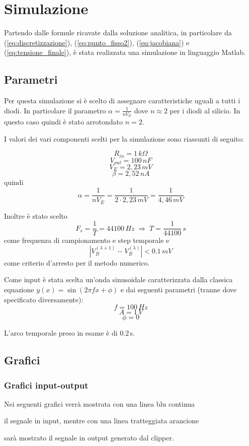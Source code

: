 \chapter{Simulazione}
	Partendo dalle formule ricavate dalla soluzione analitica, in particolare da (\ref{eq:discretizzazione}), (\ref{eq:punto_fisso2}), (\ref{eq:jacobiana}) e (\ref{eq:tensione_finale}), è stata realizzata una simulazione in linguaggio Matlab.
	
	\section{Parametri}
		Per questa simulazione si è scelto di assegnare caratteristiche uguali a tutti i diodi. In particolare il parametro $\alpha = \frac{1}{nV_{E}}$ dove $n \approx 2$ per i diodi al silicio. In questo caso quindi è stato arrotondato $n = 2$.
	
		I valori dei vari componenti scelti per la simulazione sono riassunti di seguito:
	
		\[
			R_{in} = 1\,k\Omega
		\]
		\[
			V_{out} = 100\,nF
		\]
		\[
			V_{E} = 2,23\,mV
		\]
		\[
			\beta = 2,52\,nA
		\]
		quindi
		\[
			\alpha = \frac{1}{nV_{E}} = \frac{1}{2 \cdot 2,23\,mV} = \frac{1}{4,46\,mV}
		\]
	
		Inoltre è stato scelto
		\[
			F_{s} = \frac{1}{T} = 44100\,Hz \; \Rightarrow \; T = \frac{1}{44100}\,s
		\]
		come frequenza di campionamento e step temporale e
		\[
			|V_{B}^{(\lambda+1)} - V_{B}^{(\lambda)}| < 0.1\,mV
		\]
		come criterio d'arresto per il metodo numerico.
	
		Come input è stata scelta un'onda sinusoidale caratterizzata dalla classica equazione $y(x) = \sin (2 \pi f x + \phi)$ e dai seguenti parametri (tranne dove specificato diversamente):
		\[
			f = 100\,Hz
		\]
		\[
			A = 1\,V
		\]
		\[
			\phi = 0
		\]
		
		\vspace{10px}
		L'arco temporale preso in esame è di 0.2\,s.
	\pagebreak
	
	\section{Grafici}
		\subsection{Grafici input-output}
			Nei seguenti grafici verrà mostrata con una linea blu continua
			il segnale in \textcolor{matlab_blue}{input}, mentre con una linea tratteggiata arancione
			sarà mostrato il segnale in \textcolor{matlab_orange}{output} generato dal clipper.
		
